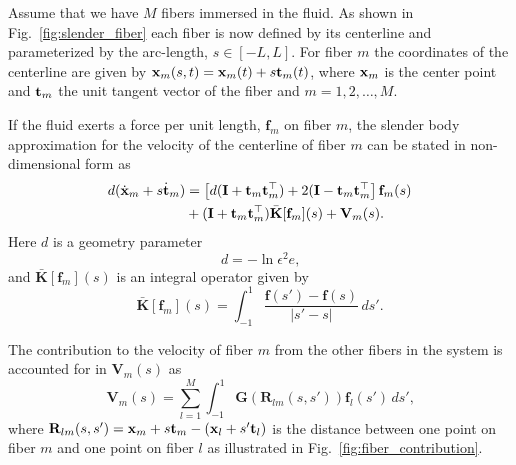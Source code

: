 Assume that we have $M$ fibers immersed in the fluid. As shown in Fig.~\ref{fig:slender_fiber} each fiber is now defined by its centerline and parameterized by the arc-length, $s \in [-L,L]$. For fiber $m$ the coordinates of the centerline are given by $\mathbf{x}_m(s,t) = \mathbf{x}_m(t) + s\mathbf{t}_m(t)$, where $\mathbf{x}_m$ is the center point and $\mathbf{t}_m$ the unit tangent vector of the fiber and $m=1,2,\dots,M$.

If the fluid exerts a force per unit length, $\mathbf{f}_m$ on fiber $m$, the slender body approximation for the velocity of the centerline of fiber $m$ can be stated in non-dimensional form as
\begin{equation}
  \label{eq:velocity_centerline}
  \begin{aligned}
    d(\dot{\mathbf{x}}_m + s \dot{\mathbf{t}}_m) &= \left[ d(\mathbf{I} + \mathbf{t}_m\mathbf{t}_m^\top) + 2(\mathbf{I} - \mathbf{t}_m\mathbf{t}_m^\top\right]\mathbf{f}_m(s) \\
    &+ (\mathbf{I} + \mathbf{t}_m\mathbf{t}_m^\top)\bar{\mathbf{K}}[\mathbf{f}_m](s) + \mathbf{V}_m(s) \text{.}
  \end{aligned}
\end{equation}
Here $d$ is a geometry parameter
\begin{equation}
  \label{eq:geometry_parameter}
  d = -\ln{\epsilon^2e} \text{,}
\end{equation}
and $\bar{\mathbf{K}}[\mathbf{f}_m](s)$ is an integral operator given by
\begin{equation}
  \label{eq:integral_operator}
  \bar{\mathbf{K}}[\mathbf{f}_m](s) = \int_{-1}^{1} \frac{\mathbf{f}(s') - \mathbf{f}(s)}{|s' - s|} \, ds' \text{.}
\end{equation}

The contribution to the velocity of fiber $m$ from the other fibers in the system is accounted for in $\mathbf{V}_m(s)$ as
\begin{equation}
  \label{eq:velocity_contribution}
  \mathbf{V}_m(s) = \sum_{l=1}^M \int_{-1}^{1} \mathbf{G}(\mathbf{R}_{lm}(s,s'))\mathbf{f}_l(s') \, ds' \text{,}
\end{equation}
where $\mathbf{R}_{lm}(s,s') = \mathbf{x}_m + s\mathbf{t}_m - (\mathbf{x}_l + s'\mathbf{t}_l)$ is the distance between one point on fiber $m$ and one point on fiber $l$ as illustrated in Fig.~\ref{fig:fiber_contribution}.

